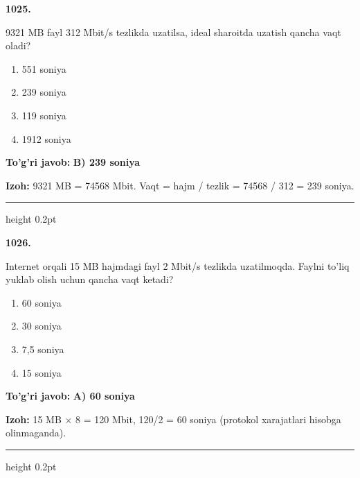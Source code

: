 \documentclass[10pt,a4paper,oneside]{article}
\begin{document}
\noindent\textbf{\color{ink}1025.}
\par
9321 MB fayl 312 Mbit/s tezlikda uzatilsa, ideal sharoitda uzatish qancha vaqt oladi?
\begin{enumerate}[label=\Alph*),leftmargin=9mm]
\item 551 soniya
\item 239 soniya
\item 119 soniya
\item 1912 soniya
\end{enumerate}
\begin{tcolorbox}[enhanced,breakable,colback=teal!4,colframe=teal!50!black,boxrule=0.5pt,arc=1.1mm,left=3mm,right=3mm,top=1.7mm,bottom=1.7mm,before skip=2mm,after skip=2mm]
\textbf{\color{teal}To'g'ri javob:} \textbf{B) 239 soniya}
\par\smallskip
\textbf{Izoh:} 9321 MB = 74568 Mbit. Vaqt = hajm / tezlik = 74568 / 312 = 239 soniya.
\end{tcolorbox}
\vspace{2mm}\hrule height 0.2pt \vspace{3mm}

\noindent\textbf{\color{ink}1026.}
\par
Internet orqali 15 MB hajmdagi fayl 2 Mbit/s tezlikda uzatilmoqda. Faylni to'liq yuklab olish uchun qancha vaqt ketadi?
\begin{enumerate}[label=\Alph*),leftmargin=9mm]
\item 60 soniya
\item 30 soniya
\item 7,5 soniya
\item 15 soniya
\end{enumerate}
\begin{tcolorbox}[enhanced,breakable,colback=teal!4,colframe=teal!50!black,boxrule=0.5pt,arc=1.1mm,left=3mm,right=3mm,top=1.7mm,bottom=1.7mm,before skip=2mm,after skip=2mm]
\textbf{\color{teal}To'g'ri javob:} \textbf{A) 60 soniya}
\par\smallskip
\textbf{Izoh:} 15 MB \ensuremath{\times} 8 = 120 Mbit, 120/2 = 60 soniya (protokol xarajatlari hisobga olinmaganda).
\end{tcolorbox}
\vspace{2mm}\hrule height 0.2pt \vspace{3mm}
\end{document}
